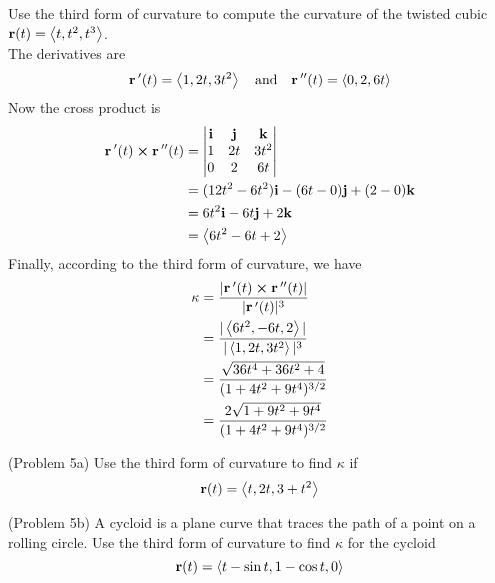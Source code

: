 \documentclass[handout]{ximera}
\begin{document}
\begin{example}[Example 5]
Use the third form of curvature to compute the curvature of the twisted cubic $\mathbf r(t) = \left\langle t, t^2, t^3\right\rangle$.\\
The derivatives are
\[
\mathbf r\,'(t) = \left\langle 1, 2t, 3t^2\right\rangle \quad \text{and} \quad \mathbf r\,''(t) = \left\langle 0, 2, 6t\right\rangle
\]
Now the cross product is
 \begin{align*}
 \mathbf  r\,'(t) \boldsymbol\times \mathbf r\,''(t) &= 
 \begin{vmatrix}
\mathbf{i} & \mathbf{j} & \mathbf{k}\\
1 & 2t & 3t^2\\
0 & 2 & 6t
\end{vmatrix}\\
&= (12t^2 - 6t^2) \mathbf{i} - (6t - 0) \mathbf{j} + (2-0) \mathbf{k}\\
 &=6t^2 \mathbf{i} -6t \mathbf{j} + 2 \mathbf{k}\\
 &=\left\langle 6t^2 - 6t +2\right\rangle
 \end{align*}
Finally, according to the third form of curvature, we have
\begin{align*}
\kappa &=  \frac{|\mathbf r\,'(t) \boldsymbol\times \mathbf r\,''(t)|}{|\mathbf r\,'(t)|^3}\\
       &=  \frac{|\left\langle 6t^2,  -6t, 2\right\rangle|}{|\left\langle 1, 2t, 3t^2\right\rangle|^3}\\
       &= \frac{\sqrt{36t^4 + 36t^2 + 4}}{(1 + 4t^2 + 9t^4)^{3/2}}\\
       &= \frac{2\sqrt{1 + 9t^2 + 9t^4}}{(1 + 4t^2 + 9t^4)^{3/2}}
\end{align*}
\end{example}

\begin{problem}(Problem 5a)
Use the third form of curvature to find $\kappa$ if 
\[
\mathbf r(t) = \left\langle t, 2t, 3+t^2\right\rangle
\]

\begin{multipleChoice}
\end{multipleChoice}

\end{problem}

\begin{problem}(Problem 5b)
A cycloid is a plane curve that traces the path of a point on a rolling circle.
Use the third form of curvature to find $\kappa$ for the cycloid 
\[
\mathbf r(t) = \left\langle t - \sin t, 1 - \cos t, 0\right\rangle
\]

\begin{multipleChoice}
\end{multipleChoice}

\end{problem}
\end{document}
